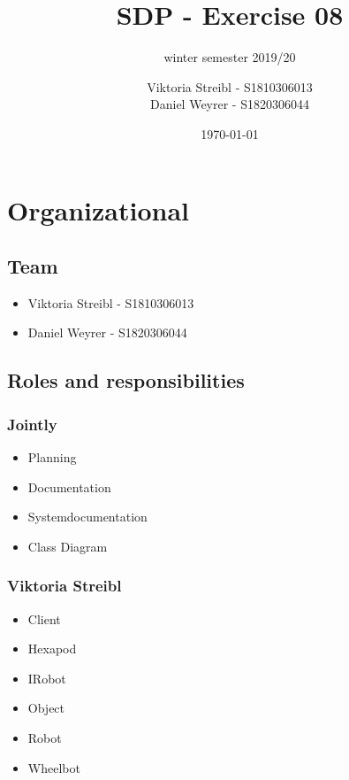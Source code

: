 
\graphicspath{{./}}



\title{SDP - Exercise 08} %
\subtitle{winter semester 2019/20} %
\author{
Viktoria Streibl - S1810306013\\
  Daniel Weyrer - S1820306044
} %
\date{\today} %

\maketitle %

\newpage
\tableofcontents %
\newpage


\section{Organizational}
\subsection{Team}
\begin{itemize}
	\item Viktoria 	Streibl 		- 	S1810306013
	\item Daniel 	Weyrer		-	S1820306044
\end{itemize}

\subsection{Roles and responsibilities}
\subsubsection{Jointly}
\begin{itemize}
	\item Planning
	\item Documentation
	\item Systemdocumentation
	\item Class Diagram
\end{itemize}

\subsubsection{Viktoria Streibl}
\begin{itemize}
	\item Client
	\item Hexapod
	\item IRobot
	\item Object
	\item Robot
	\item Wheelbot
\end{itemize}

